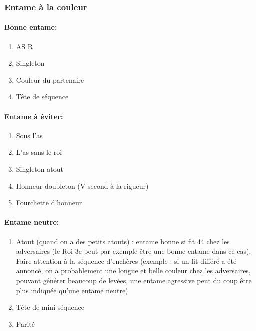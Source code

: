 \documentclass[a4paper]{article}
\begin{document}
\subsubsection{Entame à la couleur}

\paragraph{Bonne entame:}

\begin{enumerate}
\item AS R

\item Singleton

\item Couleur du partenaire

\item Tête de séquence

\end{enumerate}

\paragraph{Entame à éviter:}

\begin{enumerate}
\item Sous l’as

\item L’as sans le roi

\item Singleton atout

\item Honneur doubleton (V second à la rigueur)

\item Fourchette d’honneur

\end{enumerate}

\paragraph{Entame neutre:}

\begin{enumerate}
\item Atout (quand on a des petits atouts) : entame bonne si fit 44 chez les adversaires (le Roi 3e peut par exemple être une bonne entame dans ce cas). Faire attention à la séquence d’enchères (exemple : si un fit différé a été annoncé, on a probablement une longue et belle couleur chez les adversaires, pouvant générer beaucoup de levées, une entame agressive peut du coup être plus indiquée qu’une entame neutre)

\item Tête de mini séquence

\item Parité

\end{enumerate}
\end{document}
